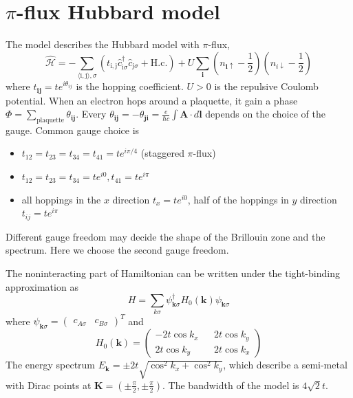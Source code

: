 \documentclass[12pt]{article}
\numberwithin{equation}{section}
\begin{document}
\section{$\pi$-flux Hubbard model}
The model describes the Hubbard model with $\pi$-flux,
\begin{equation}
	\hat{\mathcal{H}}=-\sum_{\langle\mathrm{i}, \mathrm{j}\rangle, \sigma}\left(t_{\mathrm{i}, \mathrm{j}} \hat{c}_{\mathrm{i} \sigma}^{\dagger} \hat{c}_{\mathrm{j} \sigma}+\mathrm{H.c.}\right)+ U\sum_{\mathbf{i}}\left(n_{\mathbf{i}\uparrow}-\frac{1}{2}\right)\left(n_{i\downarrow}-\frac{1}{2}\right)
	\end{equation}
where $t_{\mathbf{i}\mathbf{j}}=te^{i\theta_{ij}}$ is the hopping coefficient. $U>0$ is the repulsive Coulomb potential. When an electron hops around a plaquette, it gain a phase $\Phi = \sum_{\mathrm{plaquette}}\theta_{\mathbf{ij}}$. Every $\theta_{\mathbf{ij}}=-\theta_{\mathbf{ji}}=\frac{e}{\hbar c}\int \mathbf{A}\cdot d\mathbf{l}$ depends on the choice of the gauge. Common gauge choice is 
\begin{itemize}
	\item $t_{12} = t_{23} = t_{34} = t_{41} = te^{i\pi/4}$ (staggered $\pi$-flux)
	\item $t_{12} =  t_{23} = t_{34} = te^{i0}, t_{41} = te^{i\pi}$
	\item all hoppings in the $x$ direction $t_{x} = te^{i0}$, half of the hoppings in $y$ direction $t_{ij} = te^{i\pi}$  
\end{itemize}
Different gauge freedom may decide the shape of the Brillouin zone and the spectrum. Here we choose the second gauge freedom.\par 
The noninteracting part of Hamiltonian can be written under the tight-binding approximation as 
\begin{equation}
	H = \sum_{k\sigma}\psi_{\mathbf{k}\sigma}^\dagger H_0(\mathbf{k})\psi_{\mathbf{k}\sigma}
\end{equation}
where $\psi_{\mathbf{k}\sigma} =(\begin{matrix}
	c_{A\sigma}  & c_{B\sigma}
\end{matrix})^T$
and
\begin{equation}
	H_0(\mathbf{k}) = \left(\begin{matrix}
		-2t\cos k_x  && 2t \cos k_y\\
		2t\cos k_y   && 2t\cos k_x
	\end{matrix}\right)
\end{equation}
The energy spectrum  $E_{\mathbf{k}}=\pm 2t\sqrt{\cos^2 k_x +\cos^2 k_y}$, which describe a semi-metal with Dirac points at $\mathbf{K} = (\pm \frac{\pi}{2},\pm\frac{\pi}{2})$. The bandwidth of the model is $4\sqrt{2}t$. \par 
\end{document}
